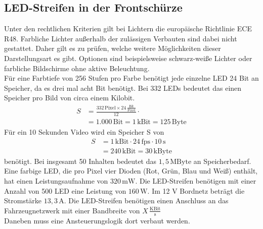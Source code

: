 \subsection{LED-Streifen in der Frontschürze}
Unter den rechtlichen Kriterien gilt bei Lichtern die europäische Richtlinie ECE R48. Farbliche Lichter außerhalb der zulässigen Verbauten sind dabei nicht gestattet. Daher gilt es zu prüfen, welche weitere Möglichkeiten dieser Darstellungsart es gibt. Optionen sind beispielsweise schwarz-weiße Lichter oder farbliche Bildschirme ohne aktive Beleuchtung. \\
Für eine Farbtiefe von 256 Stufen pro Farbe benötigt jede einzelne LED 24 Bit an Speicher, da es drei mal acht Bit benötigt. Bei 332 LEDs bedeutet das einen Speicher pro Bild von circa einem Kilobit. 
\begin{align}
	S &= \frac{332\,\mathrm{Pixel} \times 24\,\frac{\mathrm{Bit}}{\mathrm{Pixel}}}{12} \cdot \\
	&= 1.000\,\mathrm{Bit} = 1\,\mathrm{kBit} = 125\,\mathrm{Byte}
\end{align}
Für ein 10 Sekunden Video wird ein Speicher S von 
\begin{align}
	S &= 1\,\mathrm{kBit} \cdot 24\,\mathrm{fps} \cdot 10\,\mathrm{s}\\
	&= 240\,\mathrm{kBit} = 30\,\mathrm{kByte}
\end{align}
benötigt. Bei insgesamt 50 Inhalten bedeutet das $ 1,5\,\mathrm{MByte} $ an Speicherbedarf. \\
Eine farbige LED, die pro Pixel vier Dioden (Rot, Grün, Blau und Weiß) enthält, hat einen Leistungsaufnahme von $ 320\,\mathrm{mW} $.  
Die LED-Streifen benötigen mit einer Anzahl von 500 LED eine Leistung von $ 160\,\mathrm{W} $. Im 12 V Bordnetz beträgt die Stromstärke $ 13,3\,\mathrm{A} $. 
Die LED-Streifen benötigen einen Anschluss an das Fahrzeugnetzwerk mit einer Bandbreite von $ X\,\frac{\mathrm{KBit}}{\mathrm{s}} $ \\
Daneben muss eine Ansteuerungslogik dort verbaut werden.
